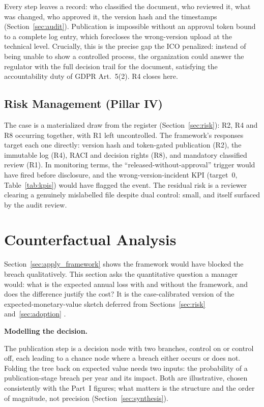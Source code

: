 \documentclass[12pt,a4paper]{article}
\begin{document}
Every step leaves a record: who classified the document, who reviewed it, what was changed, who approved it, the version hash and the timestamps (Section~\ref{sec:audit}). Publication is impossible without an approval token bound to a complete log entry, which forecloses the wrong-version upload at the technical level. Crucially, this is the precise gap the ICO penalized: instead of being unable to show a controlled process, the organization could answer the regulator with the full decision trail for the document, satisfying the accountability duty of GDPR Art.~5(2). R4 closes here.

\subsection{Risk Management (Pillar IV)}

The case is a materialized draw from the register (Section~\ref{sec:risk}): R2, R4 and R8 occurring together, with R1 left uncontrolled. The framework's responses target each one directly: version hash and token-gated publication (R2), the immutable log (R4), RACI and decision rights (R8), and mandatory classified review (R1). In monitoring terms, the ``released-without-approval'' trigger would have fired before disclosure, and the wrong-version-incident KPI (target~$0$, Table~\ref{tab:kpis}) would have flagged the event. The residual risk is a reviewer clearing a genuinely mislabelled file despite dual control: small, and itself surfaced by the audit review.

\section{Counterfactual Analysis}
\label{sec:counterfactual}

Section~\ref{sec:apply_framework} shows the framework would have blocked the breach qualitatively. This section asks the quantitative question a manager would: what is the expected annual loss with and without the framework, and does the difference justify the cost? It is the case-calibrated version of the expected-monetary-value sketch deferred from Sections~\ref{sec:risk} and~\ref{sec:adoption} \cite{falchi_slides}.

\noindent\textbf{Modelling the decision.}\par
The publication step is a decision node with two branches, control on or control off, each leading to a chance node where a breach either occurs or does not. Folding the tree back on expected value needs two inputs: the probability of a publication-stage breach per year and its impact. Both are illustrative, chosen consistently with the Part~I figures; what matters is the structure and the order of magnitude, not precision (Section~\ref{sec:synthesis}).
\end{document}
